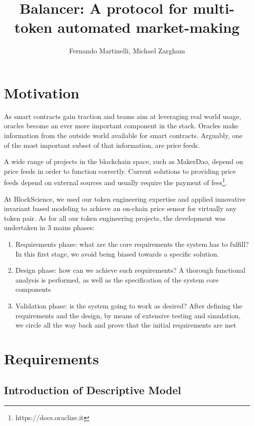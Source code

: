 \documentclass[11pt]{amsart}
\title{Balancer: A protocol for multi-token automated market-making}
\author{Fernando Martinelli, Michael Zargham}
\begin{document}
\maketitle
\section{Motivation}

As smart contracts gain traction and teams aim at leveraging real world usage, oracles become an ever more important component in the stack. Oracles make information from the outside world available for smart contracts. Arguably, one of the most important subset of that information, are price feeds. 

A wide range of projects in the blockchain space, such as MakerDao, depend on price feeds in order to function correctly. Current solutions to providing price feeds depend on external sources and usually require the payment of fees\footnote{https://docs.oraclize.it}. 

At BlockScience, we used our token engineering expertise and applied innovative invariant based modeling to achieve an on-chain price sensor for virtually any token pair. As for all our token engineering projects, the development was undertaken in 3 mains phases: 
\begin{enumerate}
    \item Requirements phase: what are the core requirements the system has to fulfill? In this first stage, we avoid being biased towards a specific solution. 
    \item Design phase: how can we achieve such requirements? A thorough functional analysis is performed, as well as the specification of the system core components
    \item Validation phase: is the system going to work as desired? After defining the requirements and the design, by means of extensive testing and simulation, we circle all the way back and prove that the initial requirements are met
\end{enumerate}

\section{Requirements}

\subsection{Introduction of Descriptive Model}
\end{document}
